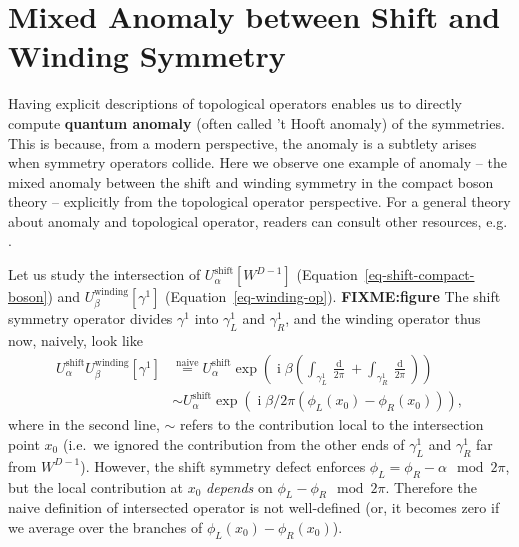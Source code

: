 \documentclass[
  letterpaper,
  DIV=11,
  numbers=noendperiod]{scrreport}
\DeclareMathOperator{\imunit}{i}
\newcommand{\stdim}{D}
\begin{document}
\hypertarget{mixed-anomaly-between-shift-and-winding-symmetry}{%
\section{Mixed Anomaly between Shift and Winding
Symmetry}\label{mixed-anomaly-between-shift-and-winding-symmetry}}

Having explicit descriptions of topological operators enables us to
directly compute \textbf{quantum anomaly} (often called 't Hooft
anomaly) of the symmetries. This is because, from a modern perspective,
the anomaly is a subtlety arises when symmetry operators collide. Here
we observe one example of anomaly -- the mixed anomaly between the shift
and winding symmetry in the compact boson theory -- explicitly from the
topological operator perspective. For a general theory about anomaly and
topological operator, readers can consult other resources, e.g.
\textcite{TachikawaTasi}.

Let us study the intersection of \(U_\alpha^\text{shift}[W^{\stdim-1}]\)
(Equation~\ref{eq-shift-compact-boson}) and
\(U_\beta^\text{winding}[\gamma^1]\) (Equation~\ref{eq-winding-op}).
\textbf{FIXME:figure} The shift symmetry operator divides \(\gamma^1\)
into \(\gamma^1_L\) and \(\gamma^1_R\), and the winding operator thus
now, naively, look like \[
\begin{aligned}
U^\text{shift}_\alpha U^\text{winding}_\beta[\gamma^1] &\stackrel{\text{naive}}{=} U^\text{shift}_\alpha \exp\left(\imunit\beta \left(\int_{\gamma^1_L}\frac{\mathop{d\phi_L}}{2\pi} + \int_{\gamma^1_R}\frac{\mathop{d\phi_R}}{2\pi}\right)\right)\\
& \sim U^\text{shift}_\alpha \exp\left(\imunit\beta/2\pi (\phi_L(x_0) - \phi_R(x_0)) \right),
\end{aligned}
\] where in the second line, \(\sim\) refers to the contribution local
to the intersection point \(x_0\) (i.e.~we ignored the contribution from
the other ends of \(\gamma^1_L\) and \(\gamma^1_R\) far from
\(W^{\stdim-1}\)). However, the shift symmetry defect enforces
\(\phi_L = \phi_R - \alpha \mod 2\pi\), but the local contribution at
\(x_0\) \emph{depends} on \(\phi_L-\phi_R \mod 2\pi\). Therefore the
naive definition of intersected operator is not well-defined (or, it
becomes zero if we average over the branches of
\(\phi_L(x_0) -\phi_R(x_0)\)).
\end{document}
